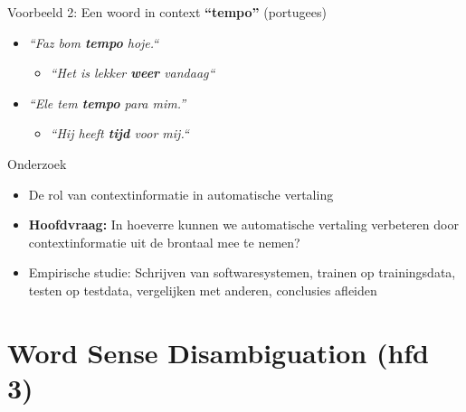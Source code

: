 \documentclass[8pt]{beamer}
\begin{document}
\begin{frame}

    \begin{block}{Voorbeeld 2: Een woord in context}
        {\Large\textbf{``tempo''}} (portugees)
        \begin{itemize}
            \item \emph{``Faz bom \textbf{tempo} hoje.``}
            \begin{itemize}
                \item<2-> \emph{``Het is lekker \textbf{weer} vandaag``}
            \end{itemize}
            \item \emph{``Ele tem \textbf{tempo} para mim.''}
            \begin{itemize}
                \item<2-> \emph{``Hij heeft \textbf{tijd} voor mij.``}
            \end{itemize}
        \end{itemize}
    \end{block}

\end{frame}

\begin{frame}

	\begin{block}{Onderzoek}
        \begin{itemize}
            \item De rol van contextinformatie in automatische vertaling
            \item \textbf{Hoofdvraag:} In hoeverre kunnen we automatische vertaling verbeteren door contextinformatie uit de brontaal mee te nemen?
            \item Empirische studie: Schrijven van softwaresystemen, trainen op trainingsdata, testen op testdata,
                vergelijken met anderen, conclusies afleiden
        \end{itemize}
	\end{block}

\end{frame}


\section{Word Sense Disambiguation (hfd 3)}
\end{document}
